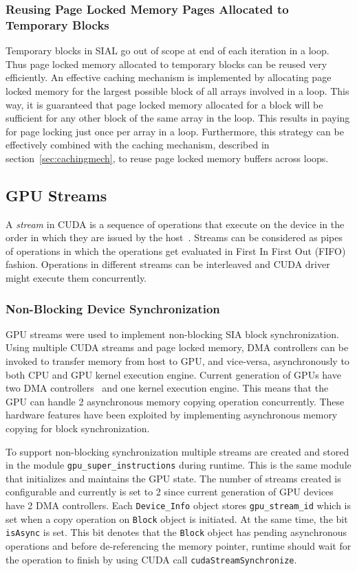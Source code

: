 \subsubsection{Reusing Page Locked Memory Pages Allocated to Temporary Blocks}
Temporary blocks in SIAL go out of scope at end of each iteration in a loop. Thus page
locked memory allocated to temporary blocks can be reused very efficiently.
An effective caching mechanism is implemented by allocating page locked memory
for the largest possible block of all arrays involved in a loop. This
way, it is guaranteed that page locked memory allocated for a block will
be sufficient for any other block of the same array in the loop. This results
in paying for page locking just once per array in a loop. Furthermore, this
strategy can be effectively combined with the caching mechanism, described
in section~\ref{sec:cachingmech}, to reuse page locked memory buffers across
loops.

\subsection{GPU Streams}
A \textit{stream} in CUDA is a sequence of operations that execute on the device
in the order in which they are issued by the host~\cite{overlapdatatransfer}.
Streams can be considered as pipes of operations in which the operations get evaluated in
First In First Out (FIFO) fashion. Operations in different streams can be interleaved
and CUDA driver might execute them concurrently.

\subsubsection{Non-Blocking Device Synchronization}\label{nonblockdevicesync}
GPU streams were used to implement non-blocking SIA block synchronization. Using
multiple CUDA streams and page locked memory, DMA controllers can be invoked to
transfer memory from host to GPU, and vice-versa, asynchronously to both CPU and GPU
kernel execution engine. Current generation of GPUs have two DMA
controllers~\cite{teslaspecs, teslakspecs} and one kernel execution engine.
This means that the GPU can handle 2 asynchronous memory copying operation concurrently.
These hardware features have been exploited by implementing asynchronous memory
copying for block synchronization.

To support non-blocking synchronization multiple streams are created and
stored in the module \texttt{gpu\_super\_instructions} during runtime. This is the same module
that initializes and
maintains the GPU state. The number of streams created is configurable and currently
is set to 2 since current generation of GPU devices have 2 DMA controllers. Each
\texttt{Device\_Info} object stores \texttt{gpu\_stream\_id} which is set when a
copy operation on \texttt{Block} object is initiated. At the same time, the bit
\texttt{isAsync} is set. This bit denotes that the \texttt{Block} object has pending
asynchronous operations and before de-referencing the memory pointer, runtime should
wait for the operation to finish by using CUDA call \texttt{cudaStreamSynchronize}.

